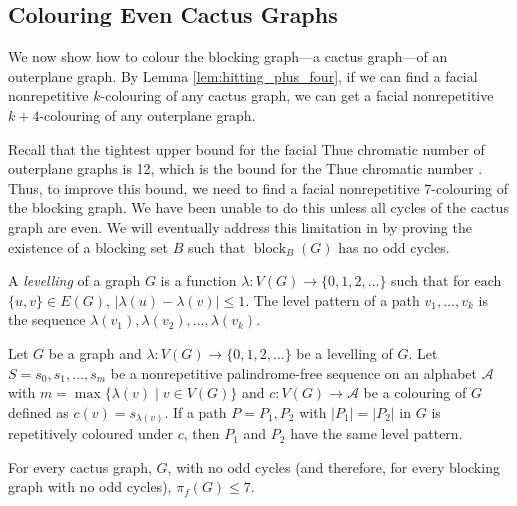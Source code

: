 \documentclass{patmorin}
\DeclareMathOperator{\block}{block}
\begin{document}
\subsection{Colouring Even Cactus Graphs}

We now show how to colour the blocking graph---a cactus graph---of an
outerplane graph.  By Lemma \ref{lem:hitting_plus_four}, if we can find
a facial nonrepetitive $k$-colouring of any cactus graph, we can get a
facial nonrepetitive $k+4$-colouring of any outerplane graph.

Recall that the tightest upper bound for the facial Thue chromatic number
of outerplane graphs is 12, which is the bound for the Thue chromatic
number \cite{barat2007square, kundgen2008nonrepetitive}. Thus, to improve
this bound, we need to find a facial nonrepetitive 7-colouring of the
blocking graph. We have been unable to do this unless all cycles of the
cactus graph are even.  We will eventually address this limitation in
 by proving the existence of a blocking set
$B$ such that $\block_B(G)$ has no odd cycles.

A \emph{levelling} of a graph $G$ is a function $\lambda\colon
V(G)\to \{0, 1, 2,\dots\}$ such that for each $\{u,v\}\in
E(G)$, $|\lambda(u)-\lambda(v)|\leq 1$. The level
pattern of a path $v_1,\ldots,v_k$ is the sequence
$\lambda(v_1),\lambda(v_2),\ldots,\lambda(v_k)$.

\begin{lem} 
 Let $G$ be a graph and $\lambda\colon V(G)\to \{0, 1,
 2,\dots\}$ be a levelling of $G$. Let $S=s_0,s_1,\ldots,s_m$
 be a nonrepetitive palindrome-free sequence on an alphabet
 $\mathcal{A}$ with $m=\max\{\lambda(v) \;|\; v \in V(G)\}$ and
 $c : V(G) \rightarrow \mathcal{A}$ be a colouring of $G$ defined
 as $c(v)=s_{\lambda(v)}$. If a path $P=P_1, P_2$ with
 $|P_1|=|P_2|$ in $G$ is repetitively coloured under $c$, then $P_1$
 and $P_2$ have the same level pattern.
\end{lem}

\begin{lem}
  For every cactus graph, $G$, with no odd cycles (and therefore, for
  every blocking graph with no odd cycles), $\pi_f(G)\le 7$.
\end{lem}
\end{document}
